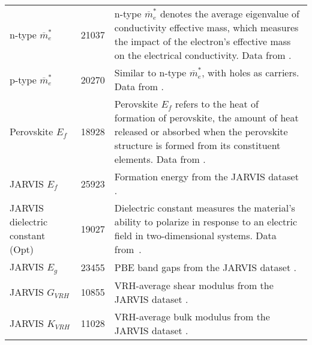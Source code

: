 {\begin{table*}[!ht]
{\begin{tabular}{lcp{11cm}}
        n-type $\overline{m}^*_e$ & 21037 & n-type $\overline{m}^*_e$ denotes the average eigenvalue of conductivity effective mass, which measures the impact of the electron's effective mass on the electrical conductivity. Data from \citet{ricci2017ab}. \\ 
        p-type $\overline{m}^*_e$ & 20270 & Similar to n-type $\overline{m}^*_e$, with holes as carriers. Data from \citet{ricci2017ab}. \\ 
        Perovskite $E_f$ & 18928 & Perovskite $E_f$ refers to the heat of formation of perovskite, the amount of heat released or absorbed when the perovskite structure is formed from its constituent elements. Data from \citet{castelli2012new}. \\ 
        JARVIS $E_f$ & 25923 & Formation energy from the JARVIS dataset \citep{choudhary2020joint}. \\ 
        JARVIS dielectric constant (Opt) & 19027 & Dielectric constant measures the material’s ability to polarize in response to an electric field in two-dimensional systems. Data from~\citet{choudhary2020joint}. \\ 
        JARVIS $E_g$ & 23455 & PBE band gaps from the JARVIS dataset \citep{choudhary2020joint}. \\ 
        JARVIS $G_{VRH}$ & 10855 & VRH-average shear modulus from the JARVIS dataset \citep{choudhary2020joint}. \\ 
        JARVIS $K_{VRH}$ & 11028 & VRH-average bulk modulus from the JARVIS dataset \citep{choudhary2020joint}. \\
        \bottomrule[1pt]
        \end{tabular}
    }
\label{tab:high-data}
\end{table*}}


